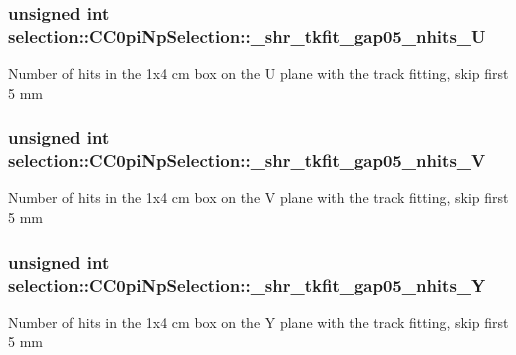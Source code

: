 \subsubsection[{\texorpdfstring{\+\_\+shr\+\_\+tkfit\+\_\+gap05\+\_\+nhits\+\_\+U}{_shr_tkfit_gap05_nhits_U}}]{\setlength{\rightskip}{0pt plus 5cm}unsigned int selection\+::\+C\+C0pi\+Np\+Selection\+::\+\_\+shr\+\_\+tkfit\+\_\+gap05\+\_\+nhits\+\_\+U\hspace{0.3cm}{\ttfamily [private]}}\hypertarget{classselection_1_1CC0piNpSelection_a06b5781f09cf3c5129efad982fa3c210}{}\label{classselection_1_1CC0piNpSelection_a06b5781f09cf3c5129efad982fa3c210}
Number of hits in the 1x4 cm box on the U plane with the track fitting, skip first 5 mm 
\subsubsection[{\texorpdfstring{\+\_\+shr\+\_\+tkfit\+\_\+gap05\+\_\+nhits\+\_\+V}{_shr_tkfit_gap05_nhits_V}}]{\setlength{\rightskip}{0pt plus 5cm}unsigned int selection\+::\+C\+C0pi\+Np\+Selection\+::\+\_\+shr\+\_\+tkfit\+\_\+gap05\+\_\+nhits\+\_\+V\hspace{0.3cm}{\ttfamily [private]}}\hypertarget{classselection_1_1CC0piNpSelection_a515d1b21ecb57c0177501823b5ec2568}{}\label{classselection_1_1CC0piNpSelection_a515d1b21ecb57c0177501823b5ec2568}
Number of hits in the 1x4 cm box on the V plane with the track fitting, skip first 5 mm 
\subsubsection[{\texorpdfstring{\+\_\+shr\+\_\+tkfit\+\_\+gap05\+\_\+nhits\+\_\+Y}{_shr_tkfit_gap05_nhits_Y}}]{\setlength{\rightskip}{0pt plus 5cm}unsigned int selection\+::\+C\+C0pi\+Np\+Selection\+::\+\_\+shr\+\_\+tkfit\+\_\+gap05\+\_\+nhits\+\_\+Y\hspace{0.3cm}{\ttfamily [private]}}\hypertarget{classselection_1_1CC0piNpSelection_a91054bcbcb38dd0684fe810167c7146f}{}\label{classselection_1_1CC0piNpSelection_a91054bcbcb38dd0684fe810167c7146f}
Number of hits in the 1x4 cm box on the Y plane with the track fitting, skip first 5 mm 
